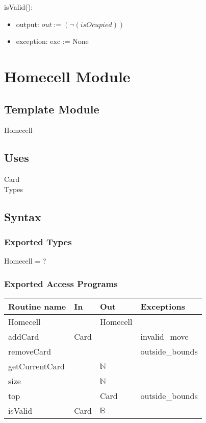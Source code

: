 \documentclass[12pt]{article}
\begin{document}
\noindent isValid():
\begin{itemize}
	\item output: $out := (\lnot(isOcupied))$
	\item exception: exc := None
\end{itemize}

\newpage

\section* {Homecell Module}

\subsection*{Template Module}

Homecell

\subsection* {Uses}

Card\\
Types

\subsection* {Syntax}

\subsubsection* {Exported Types}

Homecell = ? 

\subsubsection* {Exported Access Programs}

\begin{tabular}{| l | l | l | l |}
	\hline
	\textbf{Routine name} & \textbf{In} & \textbf{Out} & \textbf{Exceptions}\\
	\hline
	Homecell & ~ & Homecell & \\
	\hline
	addCard & Card & ~ & invalid\_move\\
	\hline
	removeCard & ~ & ~ & outside\_bounds\\
	\hline
	getCurrentCard & ~ & $\mathbb{N}$ & ~\\
	\hline
	size & ~ & $\mathbb{N}$ & ~\\
	\hline
	top & ~ & Card & outside\_bounds\\
	\hline
	isValid & Card & $\mathbb{B}$ & ~\\
	\hline
	
\end{tabular}
\end{document}
